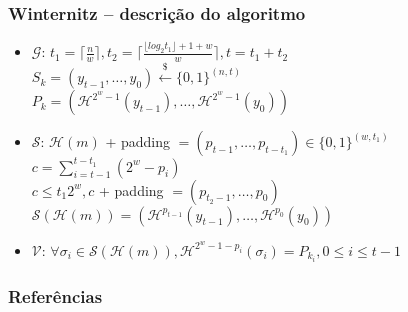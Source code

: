 \documentclass{beamer}
\begin{document}
\begin{frame}
  \frametitle{Winternitz -- descrição do algoritmo}
  \begin{itemize}
    \item $\mathcal{G}$:
      $t_1 = \lceil \frac{n}{w} \rceil,
       t_2 = \lceil \frac{\lfloor log_2 t_1 \rfloor + 1 + w}{w} \rceil,
         t = t_1 + t_2$ \\

      \hspace{1.3em}
      $S_k = (y_{t - 1}, \dots, y_{0})
        \stackrel{\$}{\longleftarrow} \{0,1\}^{(n, t)}$ \\

      \hspace{1.3em}
      $P_k = (\mathcal{H}^{2^w - 1}(y_{t - 1}), \dots,
        \mathcal{H}^{2^w - 1}(y_0))$

    \item $\mathcal{S}$:
      $\mathcal{H}(m)$ + padding
        $= (p_{t - 1}, \dots, p_{t - t_1}) \in \{0, 1\}^{(w, t_1)}$ \\

      \hspace{1.3em}
      $c = \sum_{i = t - 1}^{t - t_1} (2^w - p_i)$ \\

      \hspace{1.3em}
      $c \leq t_1 2^w, c$ + padding $= (p_{t_2 - 1}, \dots, p_{0})$ \\

      \hspace{1.3em}
      $\mathcal{S}(\mathcal{H}(m)) = (\mathcal{H}^{p_{t - 1}}(y_{t - 1}),
        \dots, \mathcal{H}^{p_0}(y_0))$

    \item $\mathcal{V}$:
      $\forall \sigma_i \in \mathcal{S}(\mathcal{H}(m)),
        \mathcal{H}^{2^w - 1 - p_{i}}(\sigma_i)
        = P_{k_i}, 0 \leq i \leq t - 1$
  \end{itemize}
\end{frame}

\begin{frame}[allowframebreaks]
  \frametitle{Referências}
  
  
\end{frame}
\end{document}

